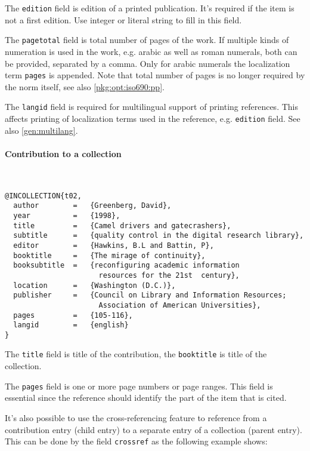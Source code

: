 \documentclass[a4paper,10pt]{ltxdockit}
\def\t|#1|{\texttt{#1}}
\def\c#1{%
\hangpara{3em}{1}%
\fullcite{#1}}
\begin{document}
The \t|edition| field is edition of a printed publication. It's required
if the item is not a first edition. Use integer or literal string to fill in
this field.

The \t|pagetotal| field is total number of pages of the work. If multiple
kinds of numeration is used in the work, e.g. arabic as well as roman numerals,
both can be provided, separated by a comma. Only for arabic numerals
the localization term \t|pages| is appended. Note that total number of pages
is no longer required by the norm itself, see also \ref{pkg:opt:iso690:pp}.

The \t|langid| field is required for multilingual support of printing
references. This affects printing of localization terms used in the reference,
e.g. \t|edition| field. See also \ref{gen:multilang}.

\paragraph{Contribution to a collection} \hfill\\

\c{t02}
\begin{verbatim}
@INCOLLECTION{t02,
  author        =   {Greenberg, David}, 
  year          =   {1998},
  title         =   {Camel drivers and gatecrashers},
  subtitle      =   {quality control in the digital research library},
  editor        =   {Hawkins, B.L and Battin, P},
  booktitle     =   {The mirage of continuity},
  booksubtitle  =   {reconfiguring academic information 
                      resources for the 21st  century}, 
  location      =   {Washington (D.C.)}, 
  publisher     =   {Council on Library and Information Resources; 
                      Association of American Universities}, 
  pages         =   {105-116},
  langid        =   {english}
}
\end{verbatim} 

The \t|title| field is title of the contribution, the \t|booktitle|
is title of the collection.

The \t|pages| field is one or more page numbers or page ranges. This field
is essential since the reference should identify the part of the item
that is cited.

It's also possible to use the cross-referencing feature to reference
from a contribution entry (child entry) to a separate entry of a collection
(parent entry). This can be done by the field \t|crossref|
as the following example shows:
\newline
\end{document}
